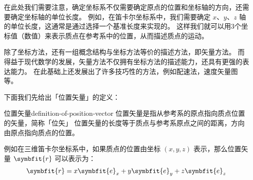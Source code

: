 在此处我们需要注意，确定坐标系不仅需要确定原点的位置和坐标轴的方向，还需要确定坐标轴的单位长度。
例如，在笛卡尔坐标系中，我们需要确定 $ x $、$ y $、$ z $ 轴的单位长度，这通常是通过选择一个基准长度来实现的。
这样我们就可以用3个坐标值（数值）来表示质点在参考系中的位置，从而描述质点的运动。

除了坐标方法，还有一组概念结构与坐标方法等价的描述方法，即矢量方法。
而得益于现代数学的发展，矢量方法不仅拥有坐标方法的描述能力，还具有更强的表达能力。
在此基础上还发展出了许多技巧性的方法，例如配速法，速度矢量图等。

下面我们先给出「位置矢量」的定义：
\begin{definition}{位置矢量}{definition-of-position-vector}
    位置矢量是指从参考系的原点指向质点位置的矢量，简称「位矢」
    位置矢量的长度等于质点与参考系原点之间的距离，方向由原点指向质点的位置。
\end{definition}

例如在三维笛卡尔坐标系中，如果质点的位置由坐标 $(x, y, z)$ 表示，那么位置矢量 $\symbfit{r}$ 可以表示为：
\begin{equation}
    \symbfit{r} = x \symbfit{e}_x + y \symbfit{e}_y + z \symbfit{e}_z
\end{equation}
